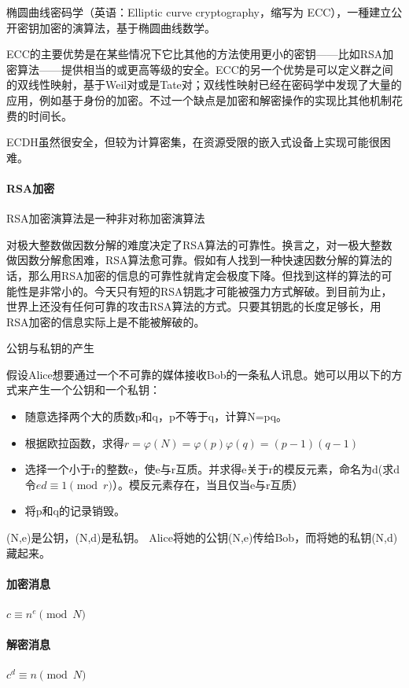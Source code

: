 \documentclass{ctexart}
\begin{document}
椭圆曲线密码学（英语：Elliptic curve cryptography，缩写为 ECC），一種建立公开密钥加密的演算法，基于椭圆曲线数学。

ECC的主要优势是在某些情况下它比其他的方法使用更小的密钥——比如RSA加密算法——提供相当的或更高等级的安全。ECC的另一个优势是可以定义群之间的双线性映射，基于Weil对或是Tate对；双线性映射已经在密码学中发现了大量的应用，例如基于身份的加密。不过一个缺点是加密和解密操作的实现比其他机制花费的时间长。

ECDH虽然很安全，但较为计算密集，在资源受限的嵌入式设备上实现可能很困难。

\paragraph{RSA加密}
RSA加密演算法是一种非对称加密演算法

对极大整数做因数分解的难度决定了RSA算法的可靠性。换言之，对一极大整数做因数分解愈困难，RSA算法愈可靠。假如有人找到一种快速因数分解的算法的话，那么用RSA加密的信息的可靠性就肯定会极度下降。但找到这样的算法的可能性是非常小的。今天只有短的RSA钥匙才可能被强力方式解破。到目前为止，世界上还没有任何可靠的攻击RSA算法的方式。只要其钥匙的长度足够长，用RSA加密的信息实际上是不能被解破的。

公钥与私钥的产生

假设Alice想要通过一个不可靠的媒体接收Bob的一条私人讯息。她可以用以下的方式来产生一个公钥和一个私钥：

\begin{itemize}
	\item 随意选择两个大的质数p和q，p不等于q，计算N=pq。
	\item 根据欧拉函数，求得$r=\varphi (N) = \varphi (p)\varphi (q)=(p-1)(q-1)$
	\item 选择一个小于r的整数e，使e与r互质。并求得e关于r的模反元素，命名为d(求d令${\displaystyle ed\equiv 1{\pmod{r}}}$）。模反元素存在，当且仅当e与r互质）
	\item 将p和q的记录销毁。
\end{itemize}

(N,e)是公钥，(N,d)是私钥。 Alice将她的公钥(N,e)传给Bob，而将她的私钥(N,d)藏起来。

\paragraph{加密消息}
${\displaystyle c\equiv n^{e}{\pmod {N}}}$
\paragraph{解密消息}
${\displaystyle c^d\equiv n{\pmod {N}}}$
\end{document}
